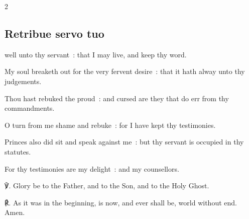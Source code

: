 \begin{multicols}{2}
\subsection{Retribue servo tuo}
 well unto thy servant~: that I may live, and keep thy word.\par
{}
My soul breaketh out for the very fervent desire~: that it hath alway unto thy judgements.\par
{}Thou hast rebuked the proud~: and cursed are they that do err from thy commandments.\par
{}O turn from me shame and rebuke~: for I have kept thy testimonies.\par
{}Princes also did sit and speak against me~: but thy servant is occupied in thy statutes.\par
{}For thy testimonies are my delight~: and my counsellors.\par
℣. Glory be to the Father, and to the Son, and to the Holy Ghost.\par
℟. As it was in the beginning, is now, and ever shall be, world without end. Amen.


\end{multicols}
